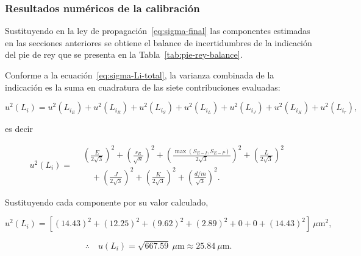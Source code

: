
\subsubsection{Resultados numéricos de la calibración}
\label{sec:pie-rey-resultados}

Sustituyendo en la ley de propagación~\eqref{eq:sigma-final} las componentes
estimadas en las secciones anteriores se obtiene el balance de incertidumbres de la
indicación del pie de rey que se presenta en la
Tabla~\ref{tab:pie-rey-balance}.



Conforme a la ecuación~\eqref{eq:sigma-Li-total}, la varianza combinada de la
indicación es la suma en cuadratura de las siete contribuciones evaluadas:

\begin{equation}
    u^2(L_i) = u^2(L_{i_E}) + u^2(L_{i_R}) + u^2(L_{i_S})
    + u^2(L_{i_L}) + u^2(L_{i_J}) + u^2(L_{i_K}) + u^2(L_{i_r}),
    \label{eq:sigma-Li-simbolico}
\end{equation}

es decir

\begin{equation}
    u^2(L_i) =
    \begin{aligned}
        &\left(\frac{E}{2\sqrt{3}}\right)^2
        + \left(\frac{s_R}{\sqrt{n}}\right)^2
        + \left(\frac{\max(S_{E-I}, S_{E-P})}{2\sqrt{3}}\right)^2
        + \left(\frac{L}{2\sqrt{3}}\right)^2 \\[4pt]
        &\quad + \left(\frac{J}{2\sqrt{3}}\right)^2
        + \left(\frac{K}{2\sqrt{3}}\right)^2
        + \left(\frac{d/m}{\sqrt{3}}\right)^2 .
    \end{aligned}
    \label{eq:sigma-Li-simbolico-exp}
\end{equation}

Sustituyendo cada componente por su valor calculado,

\begin{equation}
    u^2(L_i) = \left[(14.43)^2 + (12.25)^2 + (9.62)^2 + (2.89)^2
    + 0 + 0 + (14.43)^2\right]\ \mu\text{m}^2,
    \label{eq:sigma-Li-num}
\end{equation}

\begin{equation}
    \therefore\quad u(L_i) = \sqrt{667.59}\ \mu\text{m}
    \approx 25.84\ \mu\text{m}.
    \label{eq:sigma-Li-num-valor}
\end{equation}

